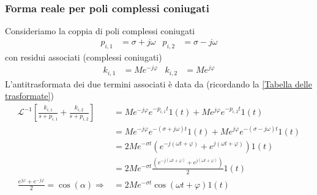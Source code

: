 \documentclass{article}
\numberwithin{equation}{subsection}
\begin{document}
\subsubsection{Forma reale per poli complessi coniugati}
Consideriamo la coppia di poli complessi coniugati
\begin{align*}
    p_{i,1} &= \sigma + j \omega & p_{i,2} &= \sigma - j \omega
\end{align*}
con residui associati (complessi coniugati)
\begin{align*}
    k_{i,1} &= Me^{-j\varphi} & k_{i,2} &= Me^{j\varphi}
\end{align*}
L'antitrasformata dei due termini associati è data da (ricordando la \ref{Tabella delle trasformate})
\begin{align*}
    \mathcal{L}^{-1} \left[\frac{k_{i,1}}{s+p_{i,1}} + \frac{k_{i,2}}{s+p_{i,2}}\right]      
                    &= M e^{-j \varphi} e^{-p_{i,1}t}1(t) + M e^{j \varphi} e^{-p_{i,2}t}1(t)
                    \\
                    &= M e^{-j \varphi} e^{-(\sigma + j \omega)t}1(t) + M e^{j \varphi} e^{-(\sigma - j \omega)t}1(t)
                    \\
                    &= 2M e^{-\sigma t} \left(e^{-j(\omega t + \varphi)} + e^{j(\omega t + \varphi)}\right)1(t) 
                    \\
                    &= 2M e^{-\sigma t} \frac{\left(e^{-j(\omega t + \varphi)} + e^{j(\omega t + \varphi)}\right)}{2} 1(t)
                    \\
                    \frac{e^{j \varphi} + e^{-j \varphi}}{2} = \cos(\alpha) \Longrightarrow
                    &= 2M e^{-\sigma t} \cos(\omega t + \varphi) 1(t)
\end{align*}
\end{document}
